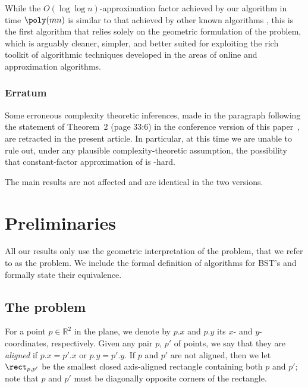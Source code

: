 While the $O(\log\log n)$-approximation factor achieved by our algorithm in time $\poly(mn)$ is similar to that achieved by other known algorithms  \cite{tango,chain_splay,multisplay}, this is the first algorithm that relies solely on the geometric formulation of the problem, which is arguably cleaner, simpler, and better suited for exploiting the rich toolkit of algorithmic techniques developed in the areas of online and approximation algorithms.

\subsubsection{Erratum} 
Some erroneous complexity theoretic inferences, made
%
%
in the paragraph following the statement of Theorem~2 (page 33:6) %
in the conference version of this paper~\cite{conf-version}, %
are retracted in the present article.  
%
In particular, at this time we are unable to rule out, under any
plausible complexity-theoretic assumption, the possibility
that constant-factor approximation of \minsat is \NP-hard.  %
%
%

The main results are not affected and are identical in the two versions. 

%

\section{Preliminaries}\label{sec: prelims}

%

All our results only use the geometric interpretation of the problem, that we refer to as the \minsat problem. 
We include the formal definition of algorithms for BST's and formally state their equivalence.  
%


%

	\subsection{The \minsat problem}
	\label{sec: problem def}

	For a point $p \in {\mathbb R}^2$ in the plane, we denote by $p.x$ and $p.y$ its $x$- and $y$-coordinates, respectively. 
	Given any pair $p$, $p'$ of points, we say that they are \emph{aligned} if $p.x=p'.x$ or $p.y=p'.y$. If $p$ and $p'$ are not aligned, then we let $\rect_{p,p'}$ be the smallest closed axis-aligned rectangle containing both $p$ and $p'$; note that $p$ and $p'$ must be diagonally opposite corners of the rectangle.
	 


